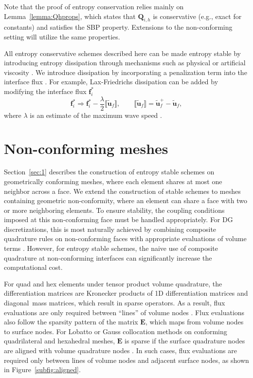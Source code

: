 \documentclass{svjour3}                     %
\renewcommand{\tilde}{\widetilde}
\newcommand{\jump}[1] {\ensuremath{\llbracket#1\rrbracket}}
\begin{document}
Note that the proof of entropy conservation relies mainly on Lemma~\ref{lemma:Qhprops}, which states that $\bm{Q}_{i,h}$ is conservative (e.g., exact for constants) and satisfies the SBP property.  Extensions to the non-conforming setting will utilize the same properties.  

All entropy conservative schemes described here can be made entropy stable by introducing entropy dissipation through mechanisms such as physical or artificial viscosity \cite{tadmor2006entropy,upperman2019entropy}.  We introduce dissipation by incorporating a penalization term into the interface flux \cite{winters2017uniquely}.  For example, Lax-Friedrichs dissipation can be added by modifying the interface flux $\bm{f}^*_i$ 
\[
\bm{f}^*_i \Longrightarrow \bm{f}^*_i - \frac{\lambda}{2} \jump{\tilde{\bm{u}}_f}, \qquad  \jump{\tilde{\bm{u}}_f} = \tilde{\bm{u}}_f^+ - \tilde{\bm{u}}_f,
\]
where $\lambda$ is an estimate of the maximum wave speed \cite{chen2017entropy, chan2017discretely}.  



\section{Non-conforming meshes}
\label{sec:2}

Section~\ref{sec:1} describes the construction of entropy stable schemes on geometrically conforming meshes, where each element shares at most one neighbor across a face.  We extend the construction of stable schemes to meshes containing geometric non-conformity, where an element can share a face with two or more neighboring elements.  To ensure stability, the coupling conditions imposed at this non-conforming face must be handled appropriately.  For DG discretizations, this is most naturally achieved by combining composite quadrature rules on non-conforming faces with appropriate evaluations of volume terms \cite{kozdon2018energy}.  However, for entropy stable schemes, the naive use of composite quadrature at non-conforming interfaces can significantly increase the computational cost.

For quad and hex elements under tensor product volume quadrature, the differentiation matrices are Kronecker products of 1D differentiation matrices and diagonal mass matrices, which result in sparse operators.  As a result, flux evaluations are only required between ``lines'' of volume nodes \cite{carpenter2014entropy, chan2018efficient}.  Flux evaluations also follow the sparsity pattern of the matrix $\bm{E}$, which maps from volume nodes to surface nodes.  For Lobatto or Gauss collocation methods on conforming quadrilateral and hexahedral meshes, $\bm{E}$ is sparse if the surface quadrature nodes are aligned with volume quadrature nodes \cite{chan2018efficient}.  In such cases, flux evaluations are required only between lines of volume nodes and adjacent surface nodes, as shown in Figure~\ref{subfig:aligned}.
\end{document}

